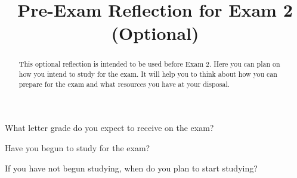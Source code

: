 \documentclass{ximera}
\title{Pre-Exam Reflection for Exam 2 (Optional)}
\begin{document}
\begin{abstract}
This optional reflection is intended to be used before Exam 2. Here you can plan on how you intend to study for the exam. It will help you to think about how you can prepare for the exam and what resources you have at your disposal.
\end{abstract}
\maketitle


\begin{question}
    What letter grade do you expect to receive on the exam?

  \begin{multipleChoice}
  \end{multipleChoice}
\end{question}

\begin{question}
    Have you begun to study for the exam?

  \begin{multipleChoice}
  \end{multipleChoice}
\end{question}

\begin{question}
    If you have not begun studying, when do you plan to start studying?

  \begin{multipleChoice}
  \end{multipleChoice}
\end{question}
\end{document}
